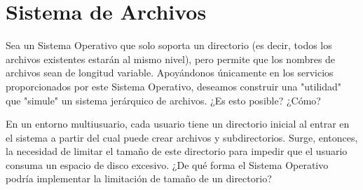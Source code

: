 \section{Sistema de Archivos}

\begin{ejercicio}
Sea un Sistema Operativo que solo soporta un directorio (es decir, todos los archivos existentes estarán al mismo nivel), pero permite que los nombres de archivos sean de longitud variable. Apoyándonos únicamente en los servicios proporcionados por este Sistema Operativo, deseamos construir una "utilidad" que "simule" un sistema jerárquico de archivos. ¿Es esto posible? ¿Cómo?
\end{ejercicio}

\begin{ejercicio}
En un entorno multiusuario, cada usuario tiene un directorio inicial al entrar en el sistema a partir del cual puede crear archivos y subdirectorios. Surge, entonces, la necesidad de limitar el tamaño de este directorio para impedir que el usuario consuma un espacio de disco excesivo. ¿De qué forma el Sistema Operativo podría implementar la limitación de tamaño de un directorio?
\end{ejercicio}

